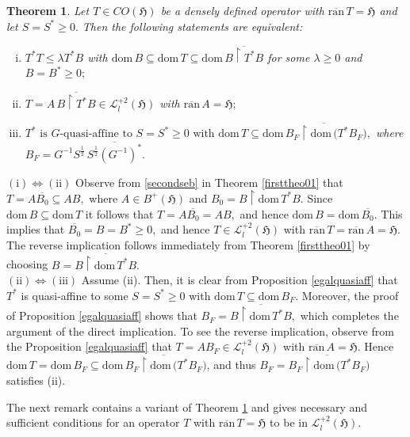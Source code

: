 \documentclass{amsart}
\makeatletter
\newtheorem{theorem}{Theorem}[section]
\newcommand{\ifaf}{\Leftrightarrow}
\newcommand{\h}{\mathfrak{H}}
\newcommand{\coh}{CO(\h)}
\newcommand{\ranbar}{\overline{\mathrm{ran}}\,}
\newcommand{\ranbarT}{\mathrm{\overline{ran}}\, T}
\newcommand{\ranbarA}{\mathrm{\overline{ran}}\, A}
\newcommand{\D}{\mathrm{dom}\,}
\newcommand{\DT}{\mathrm{dom}\,T }
\newcommand{\DB}{\mathrm{dom}\,B }
\newcommand{\adj}{^*}
\newcommand{\inv}{^{-1}}
\newcommand{\tstar}{T^{*}}
\newcommand{\half}{^{\frac{1}{2}}}
\newcommand{\inclu}{\subseteq}
\newcommand{\lplus}{B^{+}(\h)}
\newcommand{\ldeux}{\mathcal{L}_l^{+2}(\h)}
\newcommand{\rest}{\upharpoonright}
\numberwithin{equation}{section}
\renewenvironment{proof}[1][\proofname]{%
   \par\pushQED{\qed}\normalfont%
   \topsep6\p@\@plus6\p@\relax
   \trivlist\item[\hskip\labelsep\bfseries#1\@addpunct{.}]%
   \ignorespaces
}{%
   \popQED\endtrivlist\@endpefalse
}
\renewcommand{\labelenumi}{(\arabic{enumi})}
\makeatother
\begin{document}
\begin{theorem}\label{coralama}
Let $T \in \coh$ be a densely defined operator with $\ranbarT =\h$ and let   $S=S\adj \geq 0.$ Then the following statements are equivalent:
\begin{enumerate}[(i)]\def\labelenumi{\rm(\roman{enumi})}
  \item $\tstar  T \leq \lambda \tstar B  $ with $  \D B \inclu  \DT \inclu \D \overline{B \rest \tstar B}$  for some $ \lambda \geq 0$ and $ B= B\adj \geq 0;$
  \item $T = A\, \overline{B \rest \tstar B} \in \ldeux$ with $ \ranbarA = \h;$
  \item $\tstar \text{ is } G\text{-quasi-affine to } S = S^* \geq 0  \text{ with }  \DT \inclu \D \overline{B_F \rest \D(\tstar B_F}),$ where $B_F=G\inv S\half \,  \overline{S\half  {(G\inv)}\adj}.$
\end{enumerate}
\end{theorem}

\begin{proof}
 $\mathrm{(i)} \ifaf \mathrm{(ii)} $
   Observe from \eqref{secondseb} in Theorem \ref{firsttheo01}   that $T = A\overline{B_0} \inclu AB,$ where $A \in \lplus$ and  $B_0= B \rest \D \tstar B.$ Since $\DB \inclu \DT$ it follows that $T=A\overline{B_0} = A B,$ and hence $\DB =  \D\overline{B_0}.$ This implies  that $\overline{B_0}= B = B\adj \geq 0,$ and hence $T \in \ldeux$ with   $\ranbar T = \ranbar A =   \h.$      The reverse implication follows  immediately  from Theorem \ref{firsttheo01} by choosing $B= \overline{B \rest \D \tstar B}.$  \\
  \hspace*{0.3cm} $\mathrm{(ii)} \ifaf \mathrm{(iii)} $
   Assume (ii). Then, it is clear  from Proposition \ref{egalquasiaff} that $\tstar $ is  quasi-affine to some $ S = S^* \geq 0$ with $ \DT \inclu \D B_F.$ Moreover, the proof of Proposition \ref{egalquasiaff} shows that $B_F =\overline{B \rest \D \tstar B} ,$ which completes the argument of the direct implication. To see the reverse implication, observe from the Proposition \ref{egalquasiaff} that  $T =  AB_F \in \ldeux$  with $\ranbarA =\h.$ Hence $\DT = \DB_F \inclu \D \overline{B_F \rest \D(\tstar B_F})$, and thus  $ B_F= \overline{B_F \rest \D(\tstar B_F})$ satisfies (ii).
\end{proof}


The next remark contains a variant of Theorem \ref{coralama} and  gives necessary and sufficient conditions for an operator $T$ with $\ranbarT =\h$  to be in $\ldeux.$
\end{document}
